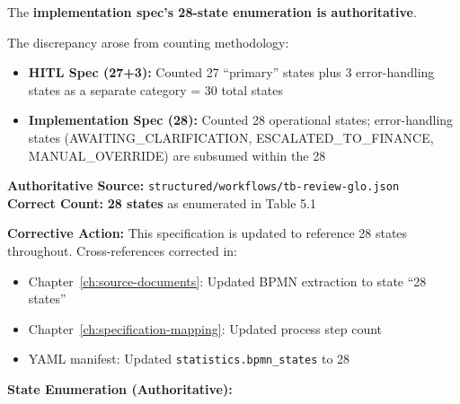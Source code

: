 \begin{tcolorbox}[colback=green!5,colframe=green!70,title=\faIcon{check-circle} Resolution Applied]
The \textbf{implementation spec's 28-state enumeration is authoritative}.

The discrepancy arose from counting methodology:
\begin{itemize}
    \item \textbf{HITL Spec (27+3):} Counted 27 ``primary'' states plus 3 error-handling 
          states as a separate category = 30 total states
    \item \textbf{Implementation Spec (28):} Counted 28 operational states; error-handling 
          states (AWAITING\_CLARIFICATION, ESCALATED\_TO\_FINANCE, MANUAL\_OVERRIDE) 
          are subsumed within the 28
\end{itemize}

\textbf{Authoritative Source:} \texttt{structured/workflows/tb-review-glo.json}\\
\textbf{Correct Count:} \textbf{28 states} as enumerated in Table 5.1

\vspace{0.5em}
\textbf{Corrective Action:} This specification is updated to reference 28 states 
throughout. Cross-references corrected in:
\begin{itemize}
    \item Chapter~\ref{ch:source-documents}: Updated BPMN extraction to state ``28 states''
    \item Chapter~\ref{ch:specification-mapping}: Updated process step count
    \item YAML manifest: Updated \texttt{statistics.bpmn\_states} to 28
\end{itemize}
\end{tcolorbox}

\textbf{State Enumeration (Authoritative):}

